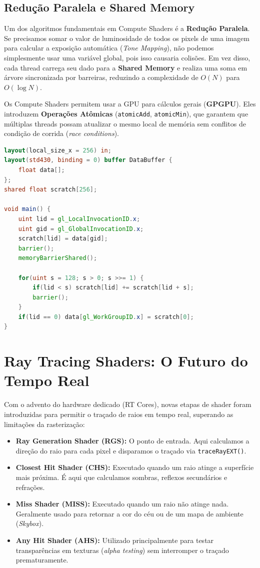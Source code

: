 \subsection{Redução Paralela e Shared Memory}

Um dos algoritmos fundamentais em Compute Shaders é a \textbf{Redução Paralela}. Se precisamos somar o valor de luminosidade de todos os pixels de uma imagem para calcular a exposição automática (\textit{Tone Mapping}), não podemos simplesmente usar uma variável global, pois isso causaria colisões. Em vez disso, cada thread carrega seu dado para a \textbf{Shared Memory} e realiza uma soma em árvore sincronizada por barreiras, reduzindo a complexidade de $O(N)$ para $O(\log N)$.

Os Compute Shaders permitem usar a GPU para cálculos gerais (\textbf{GPGPU}). Eles introduzem \textbf{Operações Atômicas} (\texttt{atomicAdd}, \texttt{atomicMin}), que garantem que múltiplas threads possam atualizar o mesmo local de memória sem conflitos de condição de corrida (\textit{race conditions}).

\begin{lstlisting}[language=GLSL, caption={Redução Paralela em Compute Shader}]
layout(local_size_x = 256) in; 
layout(std430, binding = 0) buffer DataBuffer {
    float data[];
};
shared float scratch[256];

void main() {
    uint lid = gl_LocalInvocationID.x;
    uint gid = gl_GlobalInvocationID.x;
    scratch[lid] = data[gid];
    barrier();
    memoryBarrierShared();

    for(uint s = 128; s > 0; s >>= 1) {
        if(lid < s) scratch[lid] += scratch[lid + s];
        barrier();
    }
    if(lid == 0) data[gl_WorkGroupID.x] = scratch[0];
}
\end{lstlisting}

\section{Ray Tracing Shaders: O Futuro do Tempo Real}

Com o advento do hardware dedicado (RT Cores), novas etapas de shader foram introduzidas para permitir o traçado de raios em tempo real, superando as limitações da rasterização:
\begin{itemize}
    \item \textbf{Ray Generation Shader (RGS):} O ponto de entrada. Aqui calculamos a direção do raio para cada pixel e disparamos o traçado via \texttt{traceRayEXT()}.
    \item \textbf{Closest Hit Shader (CHS):} Executado quando um raio atinge a superfície mais próxima. É aqui que calculamos sombras, reflexos secundários e refrações.
    \item \textbf{Miss Shader (MISS):} Executado quando um raio não atinge nada. Geralmente usado para retornar a cor do céu ou de um mapa de ambiente (\textit{Skybox}).
    \item \textbf{Any Hit Shader (AHS):} Utilizado principalmente para testar transparências em texturas (\textit{alpha testing}) sem interromper o traçado prematuramente.
\end{itemize}

